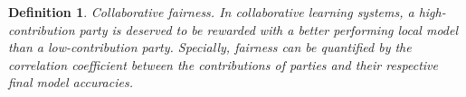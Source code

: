 \documentclass{article}
\newtheorem{definition}{Definition}
\begin{document}
\begin{definition}\label{def:fairness}
Collaborative fairness. In collaborative learning systems, a high-contribution party is deserved to be rewarded with a better performing local model than a low-contribution party. Specially, fairness can be quantified by the correlation coefficient between the contributions of parties and their respective final model accuracies. 
\end{definition}



\end{document}
